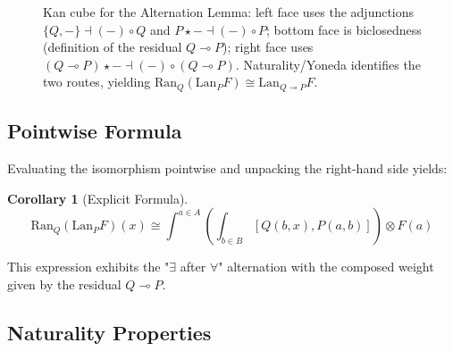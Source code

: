 \documentclass[11pt]{article}
\numberwithin{equation}{section}
\theoremstyle{upright}
\newtheorem{corollary}{Corollary}
\newcommand{\V}{\mathcal{V}}
\newcommand{\Lan}{\mathrm{Lan}}
\newcommand{\Ran}{\mathrm{Ran}}
\begin{document}
\begin{figure}[!htbp]
\centering
{}
\caption{Kan cube for the Alternation Lemma:
left face uses the adjunctions $\{Q,-\}\dashv(-)\!\circ Q$ and $P\star -\dashv(-)\!\circ P$;
bottom face is biclosedness (definition of the residual $Q\multimap P$);
right face uses $(Q\multimap P)\star -\dashv(-)\!\circ(Q\multimap P)$.
Naturality/Yoneda identifies the two routes, yielding
$\Ran_Q(\Lan_P F)\cong \Lan_{Q\multimap P}F$.}
\label{fig:kan-cube-alternation}
\end{figure}


\subsection{Pointwise Formula}

Evaluating the isomorphism pointwise and unpacking the right-hand side yields:

\begin{corollary}[Explicit Formula]
\begin{equation}
\Ran_Q(\Lan_P F)(x) \cong \int^{a \in A} \left(\int_{b \in B} [Q(b,x), P(a,b)]\right) \otimes F(a)
\end{equation}
\end{corollary}

This expression exhibits the "$\exists$ after $\forall$" alternation with the composed weight given by the residual $Q \multimap P$.

\subsection{Naturality Properties}
\end{document}
